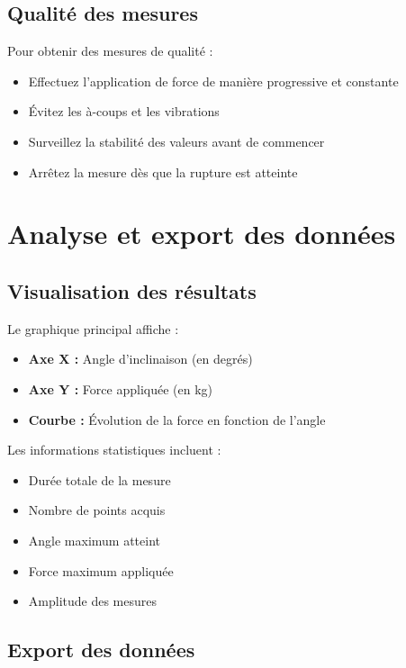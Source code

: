\documentclass[12pt,a4paper]{article}
\begin{document}
\subsection{Qualité des mesures}

Pour obtenir des mesures de qualité :
\begin{itemize}
    \item Effectuez l'application de force de manière progressive et constante
    \item Évitez les à-coups et les vibrations
    \item Surveillez la stabilité des valeurs avant de commencer
    \item Arrêtez la mesure dès que la rupture est atteinte
\end{itemize}

\section{Analyse et export des données}

\subsection{Visualisation des résultats}

Le graphique principal affiche :
\begin{itemize}
    \item \textbf{Axe X :} Angle d'inclinaison (en degrés)
    \item \textbf{Axe Y :} Force appliquée (en kg)
    \item \textbf{Courbe :} Évolution de la force en fonction de l'angle
\end{itemize}

Les informations statistiques incluent :
\begin{itemize}
    \item Durée totale de la mesure
    \item Nombre de points acquis
    \item Angle maximum atteint
    \item Force maximum appliquée
    \item Amplitude des mesures
\end{itemize}

\subsection{Export des données}
\end{document}
